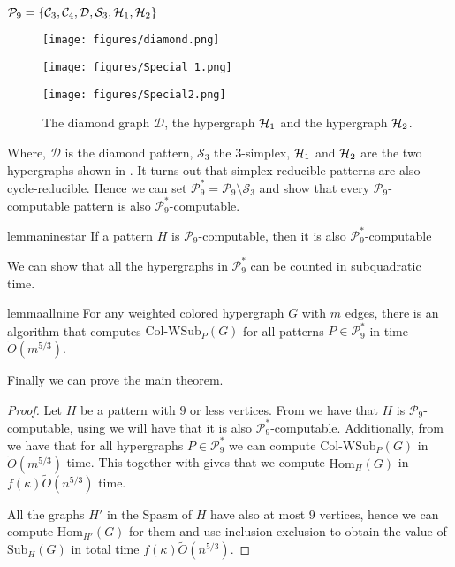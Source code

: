 \documentclass[a4paper,UKenglish,cleveref, autoref, numberwithinsect, thm-restate]{lipics-v2021}
\newcommand{\computable}[1]{${#1}$-computable}
\newcommand{\cycle}[1]{\cC_{#1}}
\newcommand{\simplex}[1]{\cS_{#1}}
\newcommand{\hyperone}{\cH_1}
\newcommand{\hypertwo}{\cH_2}
\newcommand{\diamondgraph}{\cD}
\newcommand{\WSub}[2]{\mathrm{\text{Col-WSub}}_{#2}(#1)}
\newcommand{\Hom}[2]{\mathrm{Hom}_{#2}(#1)}
\newcommand{\Sub}[2]{\mathrm{Sub}_{#2}(#1)}
\newcommand{\degen}{\kappa}
\newcommand{\cC}{{\cal C}}
\newcommand{\cD}{\mathcal{D}}
\newcommand{\cH}{{\cal H}}
\newcommand{\cP}{\mathcal{P}}
\newcommand{\cS}{\mathcal{S}}
\begin{document}
	\begin{lemma} \label{lem:nine_content}
		$
			\cP_9 = \{\cycle{3},\cycle{4},\diamondgraph,\simplex{3},\hyperone, \hypertwo\}
		$
	\end{lemma}
	\begin{figure}[t]
	\centering
	\begin{minipage}{.15\linewidth}
		\centering
		\texttt{[image: figures/diamond.png]}
	\end{minipage}
	\hspace{1cm}
	\begin{minipage}{.15\linewidth}
		\centering
		\texttt{[image: figures/Special\_1.png]}
	\end{minipage}
	\hspace{1cm}
	\begin{minipage}{.2\linewidth}
		\centering
		\texttt{[image: figures/Special2.png]}
	\end{minipage}
	\caption{The diamond graph $\diamondgraph$, the hypergraph $\hyperone$ and the hypergraph $\hypertwo$.} 
	\label{fig:hypers}
	\end{figure}
	Where, $\diamondgraph$ is the diamond pattern, $\simplex{3}$ the $3$-simplex, $\hyperone$ and $\hypertwo$ are the two hypergraphs shown in . It turns out that simplex-reducible patterns are also cycle-reducible. Hence we can set $\cP^*_9 = \cP_9 \setminus \simplex{3}$ and show that every \computable{\cP_9} pattern is also \computable{\cP^*_9}.
	
	\begin{restatable}{lemma}{ninestar} \label{lem:nine_star}
		If a pattern $H$ is \computable{\cP_9}, then it is also \computable{\cP^*_9}
	\end{restatable}

	We can show that all the hypergraphs in $\cP^*_9$ can be counted in subquadratic time.
	
	\begin{restatable}{lemma}{allnine} \label{lem:allnine}
			For any weighted colored hypergraph $G$ with $m$ edges, there is an algorithm that computes $\WSub{G}{P}$ for all patterns $P \in \cP^*_9$ in time $\tilde{O}(m^{5/3})$.
	\end{restatable}


	Finally we can prove the main theorem.
	
	\main*
	\begin{proof}
		Let $H$ be a pattern with $9$ or less vertices. From  we have that $H$ is \computable{\mathcal{P}_9}, using  we will have that it is also \computable{\cP^*_9}. Additionally, from  we have that for all hypergraphs $P\in \cP^*_9$ we can compute $\WSub{G}{P}$ in $\tilde{O}(m^{5/3})$ time. This together with  gives that we compute $\Hom{G}{H}$ in $f(\degen)\tilde{O}(n^{5/3})$ time.
		
		All the graphs $H'$ in the Spasm of $H$ have also at most $9$ vertices, hence we can compute $\Hom{G}{H'}$ for them and use inclusion-exclusion to obtain the value of $\Sub{G}{H}$ in total time $f(\degen)\tilde{O}(n^{5/3})$.
	\end{proof}
\end{document}
